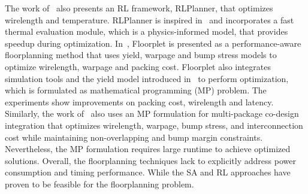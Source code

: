 The work of~\cite{duan2024RLPlanner} also presents an RL framework, RLPlanner, that optimizes wirelength and temperature. RLPlanner is inspired in~\cite{ma2021thermalFloorplan} and incorporates a fast thermal evaluation module, which is a physics-informed model, that provides speedup during optimization.
In~\cite{chen2024floorplet}, Floorplet is presented as a performance-aware floorplanning method that uses yield, warpage and bump stress models to optimize wirelength, warpage and packing cost. Floorplet also integrates simulation tools and the yield model introduced in~\cite{feng2022costModel,cunningham1990costModel} to perform optimization, which is formulated as mathematical programming (MP) problem. The experiments show improvements on packing cost, wirelength and latency.
Similarly, the work of~\cite{zhuang2022multipackage} also uses an MP formulation for multi-package co-design integration that optimizes wirelength, warpage, bump stress, and interconnection cost while maintaining non-overlapping and bump margin constraints. Nevertheless, the MP formulation requires large runtime to achieve optimized solutions.
Overall, the floorplanning techniques lack to explicitly address power consumption and timing performance. While the SA and RL approaches have proven to be feasible for the floorplanning problem.
